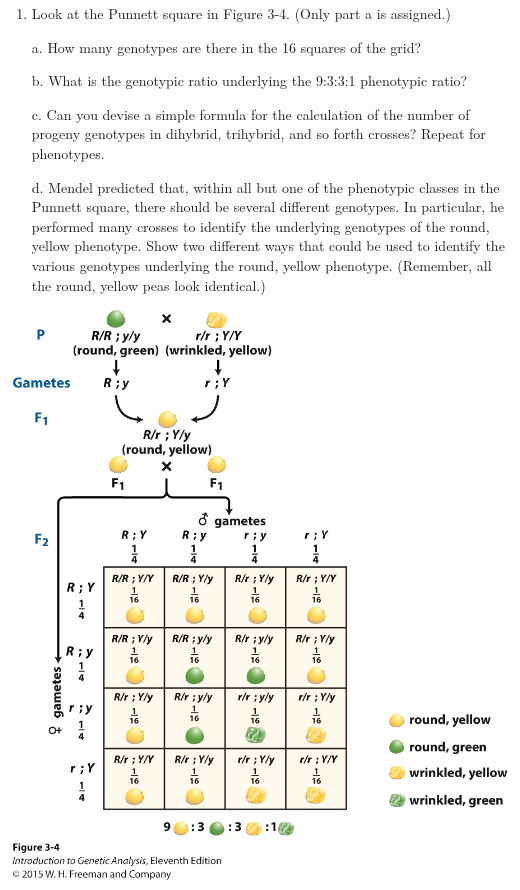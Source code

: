 \documentclass[11pt,]{article}
\providecommand{\tightlist}{%
  \setlength{\itemsep}{0pt}\setlength{\parskip}{0pt}}
\begin{document}
\begin{blackbox}

\begin{enumerate}
\def\labelenumi{\arabic{enumi}.}
\setcounter{enumi}{24}
\tightlist
\item
  Look at the Punnett square in Figure 3-4. (Only part a is assigned.)
\end{enumerate}

\begin{enumerate} 
 \item[a.]{ How many genotypes are there in the 16 squares of the grid? } 
 \item[b.]{ What is the genotypic ratio underlying the 9:3:3:1 phenotypic ratio? } 
 \item[c.]{ Can you devise a simple formula for the calculation of the number of progeny genotypes in dihybrid, trihybrid, and so forth crosses? Repeat for phenotypes. } 
 \item[d.]{ Mendel predicted that, within all but one of the phenotypic classes in the Punnett square, there should be several different genotypes. In particular, he performed many crosses to identify the underlying genotypes of the round, yellow phenotype. Show two different ways that could be used to identify the various genotypes underlying the round, yellow phenotype. (Remember, all the round, yellow peas look identical.) } 
 \end{enumerate}

\hfill\break

\begin{center}\includegraphics[width=0.45\linewidth,]{input/figure_03_04} \end{center}

\vspace{8cm}

\end{blackbox}
\end{document}
